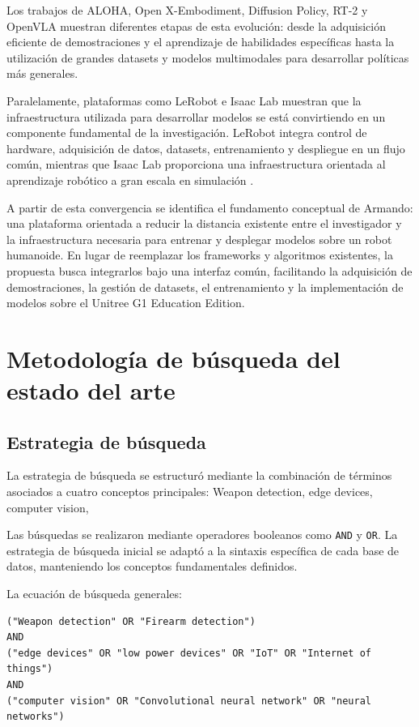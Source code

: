 \documentclass[stu,12pt,floatsintext]{apa7}
\begin{document}
Los trabajos de ALOHA, Open X-Embodiment, Diffusion Policy, RT-2 y OpenVLA muestran diferentes etapas de esta evolución: desde la adquisición eficiente de demostraciones y el aprendizaje de habilidades específicas hasta la utilización de grandes datasets y modelos multimodales para desarrollar políticas más generales.

Paralelamente, plataformas como LeRobot e Isaac Lab muestran que la infraestructura utilizada para desarrollar modelos se está convirtiendo en un componente fundamental de la investigación. LeRobot integra control de hardware, adquisición de datos, datasets, entrenamiento y despliegue en un flujo común, mientras que Isaac Lab proporciona una infraestructura orientada al aprendizaje robótico a gran escala en simulación \parencite{cadene2026lerobotopensourcelibraryendtoend}.

A partir de esta convergencia se identifica el fundamento conceptual de Armando: una plataforma orientada a reducir la distancia existente entre el investigador y la infraestructura necesaria para entrenar y desplegar modelos sobre un robot humanoide. En lugar de reemplazar los frameworks y algoritmos existentes, la propuesta busca integrarlos bajo una interfaz común, facilitando la adquisición de demostraciones, la gestión de datasets, el entrenamiento y la implementación de modelos sobre el Unitree G1 Education Edition.

\clearpage

\section{Metodología de búsqueda del estado del arte}

\subsection{Estrategia de búsqueda}

La estrategia de búsqueda se estructuró mediante la combinación de términos asociados a cuatro conceptos principales: Weapon detection,  edge devices, computer vision,

Las búsquedas se realizaron mediante operadores booleanos como \texttt{AND} y \texttt{OR}. La estrategia de búsqueda inicial se adaptó a la sintaxis específica de cada base de datos, manteniendo los conceptos fundamentales definidos.

La ecuación de búsqueda generales:

\begin{verbatim}
("Weapon detection" OR "Firearm detection")
AND
("edge devices" OR "low power devices" OR "IoT" OR "Internet of things")
AND
("computer vision" OR "Convolutional neural network" OR "neural networks")
\end{verbatim}
\end{document}
